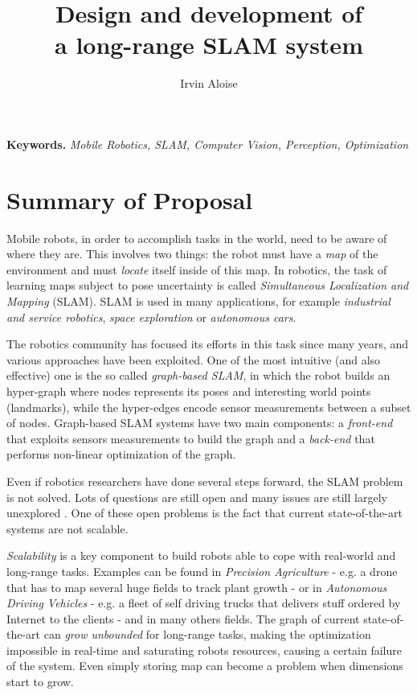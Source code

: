 \documentclass[10pt,a4paper, notitlepage]{report}
\title{Design and development of \\ a long-range SLAM system}
\author{Irvin Aloise}
\begin{document}
\maketitle


\textbf{Keywords.} \textit{Mobile Robotics, SLAM, Computer Vision, Perception, Optimization}


\section*{Summary of Proposal}
Mobile robots, in order to accomplish tasks in the world, need to be aware of where they are. This involves two things: the robot must have a \textit{map} of the environment and must \textit{locate} itself inside of this map. In robotics, the task of learning maps subject to pose uncertainty is called \textit{Simultaneous Localization and Mapping} (SLAM). SLAM is used in many applications, for example \textit{industrial and service robotics}, \textit{space exploration} or \textit{autonomous cars}. 

The robotics community has focused its efforts in this task since many years, and various approaches have been exploited. One of the most intuitive (and also effective) one is the so called \textit{graph-based SLAM}\cite{lu1997globally}, in which the robot builds an hyper-graph where nodes represents its poses and interesting world points (landmarks), while the hyper-edges encode sensor measurements between a subset of nodes. Graph-based SLAM systems have two main components: a \textit{front-end} that exploits sensors measurements to build the graph and a \textit{back-end} that performs non-linear optimization of the graph. 

Even if robotics researchers have done several steps forward, the SLAM problem is not solved. Lots of questions are still open and many issues are still largely unexplored \cite{carlone2016slam-survey}. One of these open problems is the fact that current state-of-the-art systems are not scalable. 

\textit{Scalability} is a key component to build robots able to cope with real-world and long-range tasks. Examples can be found in \textit{Precision Agriculture} - e.g. a drone that has to map several huge fields to track plant growth - or in \textit{Autonomous Driving Vehicles} - e.g. a fleet of self driving trucks that delivers stuff ordered by Internet to the clients - and in many others fields. The graph of current state-of-the-art can \textit{grow unbounded} for long-range tasks, making the optimization impossible in real-time and saturating robots resources, causing a certain failure of the system. Even simply storing map can become a problem when dimensions start to grow.
\end{document}
